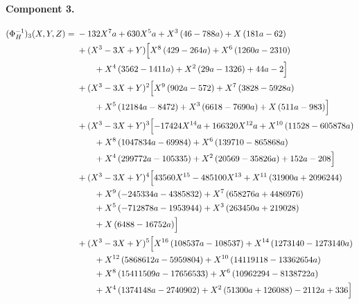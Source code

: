 \endgroup

\clearpage

\paragraph{Component 3.}

\begingroup\footnotesize\allowdisplaybreaks[4]

\begin{align*}
(\Phi_H^{-1})_3(X,Y,Z)={}&- 132 X^{7} a + 630 X^{5} a + X^{3} \left(46 - 788 a\right) + X \left(181 a - 62\right)\\
&{}+(X^3-3X+Y)\Bigl[X^{8} \left(429 - 264 a\right) + X^{6} \left(1260 a - 2310\right)\\
&\qquad + X^{4} \left(3562 - 1411 a\right) + X^{2} \left(29 a - 1326\right) + 44 a - 2\Bigr]\\
&{}+(X^3-3X+Y)^{2}\Bigl[X^{9} \left(902 a - 572\right) + X^{7} \left(3828 - 5928 a\right)\\
&\qquad + X^{5} \left(12184 a - 8472\right) + X^{3} \left(6618 - 7690 a\right) + X \left(511 a - 983\right)\Bigr]\\
&{}+(X^3-3X+Y)^{3}\Bigl[- 17424 X^{14} a + 166320 X^{12} a + X^{10} \left(11528 - 605878 a\right)\\
&\qquad + X^{8} \left(1047834 a - 69984\right) + X^{6} \left(139710 - 865868 a\right)\\
&\qquad + X^{4} \left(299772 a - 105335\right) + X^{2} \left(20569 - 35826 a\right) + 152 a - 208\Bigr]\\
&{}+(X^3-3X+Y)^{4}\Bigl[43560 X^{15} - 485100 X^{13} + X^{11} \left(31900 a + 2096244\right)\\
&\qquad + X^{9} \left(- 245334 a - 4385832\right) + X^{7} \left(658276 a + 4486976\right)\\
&\qquad + X^{5} \left(- 712878 a - 1953944\right) + X^{3} \left(263450 a + 219028\right)\\
&\qquad + X \left(6488 - 16752 a\right)\Bigr]\\
&{}+(X^3-3X+Y)^{5}\Bigl[X^{16} \left(108537 a - 108537\right) + X^{14} \left(1273140 - 1273140 a\right)\\
&\qquad + X^{12} \left(5868612 a - 5959804\right) + X^{10} \left(14119118 - 13362654 a\right)\\
&\qquad + X^{8} \left(15411509 a - 17656533\right) + X^{6} \left(10962294 - 8138722 a\right)\\
&\qquad + X^{4} \left(1374148 a - 2740902\right) + X^{2} \left(51300 a + 126088\right) - 2112 a + 336\Bigr]\\

\end{align*}
